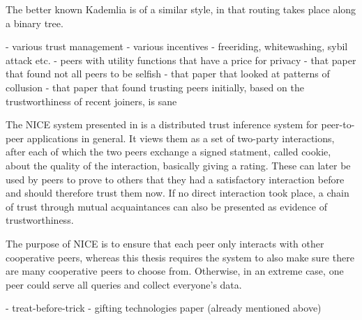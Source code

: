 The better known Kademlia\cite{maymounkov2002kademlia} is of a similar style, in
that routing takes place along a binary tree.

- various trust management
- various incentives
- freeriding, whitewashing, sybil attack etc.
- peers with utility functions that have a price for privacy
- that paper that found not all peers to be selfish
- that paper that looked at patterns of collusion
- that paper that found trusting peers initially, based on the trustworthiness
  of recent joiners, is sane

The NICE system presented in \cite{sherwood2006cooperative} is a distributed
trust inference system for peer-to-peer applications in general. It views them
as a set of two-party interactions, after each of which the two peers exchange a
signed statment, called cookie, about the quality of the interaction, basically
giving a rating. These can later be used by peers to prove to others that they
had a satisfactory interaction before and should therefore trust them now. If no
direct interaction took place, a chain of trust through mutual acquaintances can
also be presented as evidence of trustworthiness.

The purpose of NICE is to ensure that each peer only interacts with other
cooperative peers, whereas this thesis requires the system to also make sure
there are many cooperative peers to choose from. Otherwise, in an extreme case,
one peer could serve all queries and collect everyone's data.

- treat-before-trick
- gifting technologies paper (already mentioned above)
